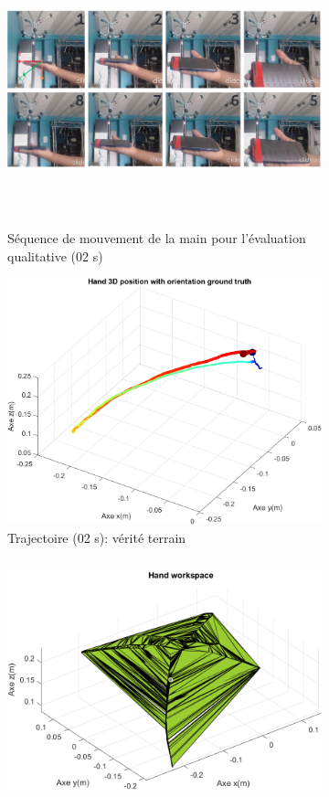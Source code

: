 \documentclass[5pt]{article}
\begin{document}
\begin{figure}[H]
\begin{subfigure}{1\textwidth}
        \centering
        \includegraphics[width=\linewidth, height=8cm]{../results/gt.png}
        \caption{Séquence de mouvement de la main pour l'évaluation qualitative (02 s)}
        \label{fig:img_mvt}
    \end{subfigure}
\begin{subfigure}{0.5\textwidth}
        \centering
        \includegraphics[width=\linewidth]{../results/mvt_1_3d.png}
        \caption{Trajectoire (02 s): vérité terrain }
        \label{subfig:traj_gt}
    \end{subfigure}
    \begin{subfigure}{0.5\textwidth}
        \centering
        \includegraphics[width=\linewidth, height=7cm]{../results/workspace_ref_min.png}

\end{subfigure}
\end{figure}
\end{document}
